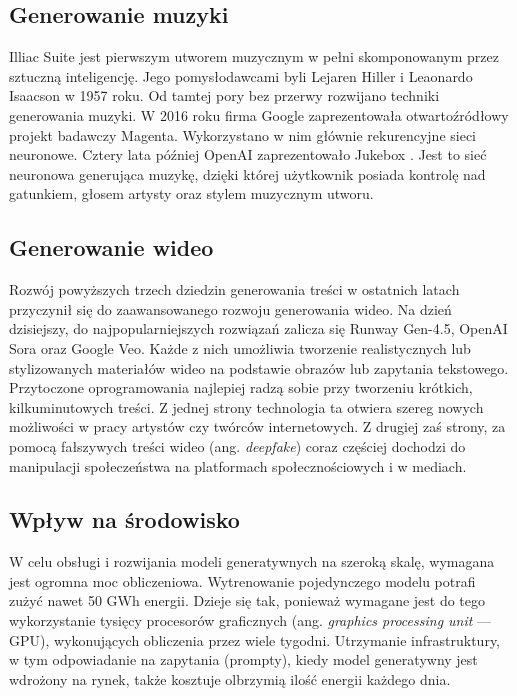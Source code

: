         
        \subsection{Generowanie muzyki}
        Illiac Suite jest pierwszym utworem muzycznym w pełni skomponowanym przez sztuczną inteligencję. Jego pomysłodawcami byli Lejaren Hiller i Leaonardo Isaacson w 1957 roku. Od tamtej pory bez przerwy rozwijano techniki generowania muzyki. W 2016 roku firma Google zaprezentowała otwartoźródłowy projekt badawczy Magenta. Wykorzystano w nim głównie rekurencyjne sieci neuronowe. Cztery lata później OpenAI zaprezentowało Jukebox \cite{dhariwal2020jukebox}. Jest to sieć neuronowa generująca muzykę, dzięki której użytkownik posiada kontrolę nad gatunkiem, głosem artysty oraz stylem muzycznym utworu.

        
        \subsection{Generowanie wideo}
        Rozwój powyższych trzech dziedzin generowania treści w ostatnich latach przyczynił się do zaawansowanego rozwoju generowania wideo. Na dzień dzisiejszy, do najpopularniejszych rozwiązań zalicza się Runway Gen-4.5, OpenAI Sora oraz Google Veo. Każde z nich umożliwia tworzenie realistycznych lub stylizowanych materiałów wideo na podstawie obrazów lub zapytania tekstowego. Przytoczone oprogramowania najlepiej radzą sobie przy tworzeniu krótkich, kilkuminutowych treści. Z jednej strony technologia ta otwiera szereg nowych możliwości w pracy artystów czy twórców internetowych. Z drugiej zaś strony, za pomocą fałszywych treści wideo (ang. \textit{deepfake}) coraz częściej dochodzi do manipulacji społeczeństwa na platformach społecznościowych i w mediach.

        
        \subsection{Wpływ na środowisko}
        W celu obsługi i rozwijania modeli generatywnych na szeroką skalę, wymagana jest ogromna moc obliczeniowa. Wytrenowanie pojedynczego modelu potrafi zużyć nawet 50 GWh energii. Dzieje się tak, ponieważ wymagane jest do tego wykorzystanie tysięcy procesorów graficznych (ang. \textit{graphics processing unit} — GPU), wykonujących obliczenia przez wiele tygodni. Utrzymanie infrastruktury, w tym odpowiadanie na zapytania (prompty), kiedy model generatywny jest wdrożony na rynek, także kosztuje olbrzymią ilość energii każdego dnia.

